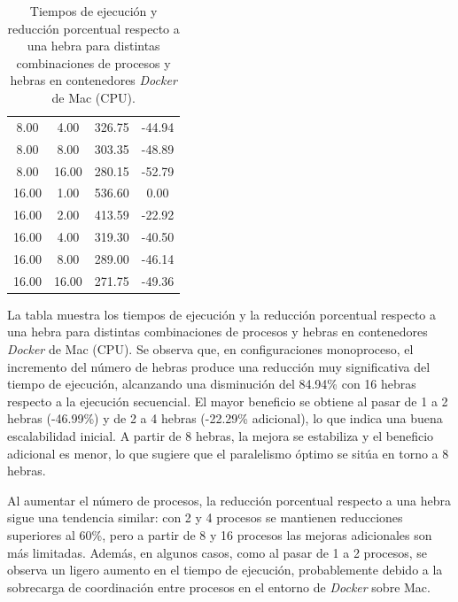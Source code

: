 \begin{table}[ht]
\begin{tabular}{|c|c|c|c|}
        8.00              & 4.00            & 326.75              & -44.94                         \\
        8.00              & 8.00            & 303.35              & -48.89                         \\
        8.00              & 16.00           & 280.15              & -52.79                         \\
        16.00             & 1.00            & 536.60              & 0.00                           \\
        16.00             & 2.00            & 413.59              & -22.92                         \\
        16.00             & 4.00            & 319.30              & -40.50                         \\
        16.00             & 8.00            & 289.00              & -46.14                         \\
        16.00             & 16.00           & 271.75              & -49.36                         \\
        \hline
    \end{tabular}
    \caption{Tiempos de ejecución y reducción porcentual respecto a una hebra para distintas combinaciones de procesos y hebras en contenedores \textit{Docker} de Mac (CPU).}
    \label{tab:thread_sweep_mac_docker_time}
\end{table}

La tabla muestra los tiempos de ejecución y la reducción porcentual respecto a una hebra para distintas combinaciones de procesos y hebras en contenedores \textit{Docker} de Mac (CPU). Se observa que, en configuraciones monoproceso, el incremento del número de hebras produce una reducción muy significativa del tiempo de ejecución, alcanzando una disminución del 84.94\% con 16 hebras respecto a la ejecución secuencial. El mayor beneficio se obtiene al pasar de 1 a 2 hebras (-46.99\%) y de 2 a 4 hebras (-22.29\% adicional), lo que indica una buena escalabilidad inicial. A partir de 8 hebras, la mejora se estabiliza y el beneficio adicional es menor, lo que sugiere que el paralelismo óptimo se sitúa en torno a 8 hebras.

Al aumentar el número de procesos, la reducción porcentual respecto a una hebra sigue una tendencia similar: con 2 y 4 procesos se mantienen reducciones superiores al 60\%, pero a partir de 8 y 16 procesos las mejoras adicionales son más limitadas. Además, en algunos casos, como al pasar de 1 a 2 procesos, se observa un ligero aumento en el tiempo de ejecución, probablemente debido a la sobrecarga de coordinación entre procesos en el entorno de \textit{Docker} sobre Mac.

